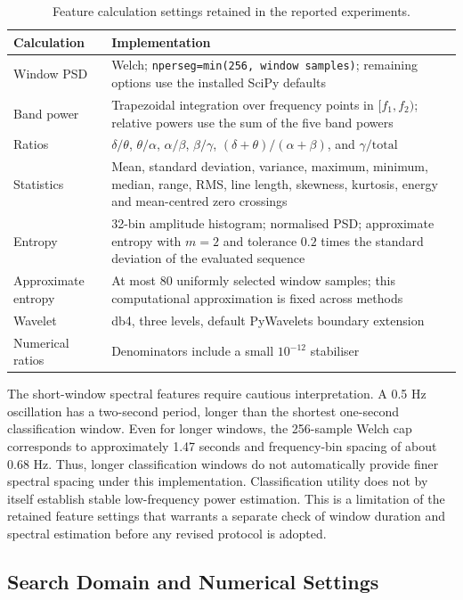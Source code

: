 \begin{table}[htbp]
\centering
\caption{Feature calculation settings retained in the reported experiments.}
\label{tab:feature-calculation-settings}
\renewcommand{\arraystretch}{1.15}
\begin{tabular}{lp{}}
\hline
Calculation & Implementation \\
\hline
Window PSD & Welch; \texttt{nperseg=min(256, window samples)}; remaining options use the installed SciPy defaults \\
Band power & Trapezoidal integration over frequency points in $[f_1,f_2)$; relative powers use the sum of the five band powers \\
Ratios & $\delta/\theta$, $\theta/\alpha$, $\alpha/\beta$, $\beta/\gamma$, $(\delta+\theta)/(\alpha+\beta)$, and $\gamma/\mathrm{total}$ \\
Statistics & Mean, standard deviation, variance, maximum, minimum, median, range, RMS, line length, skewness, kurtosis, energy and mean-centred zero crossings \\
Entropy & 32-bin amplitude histogram; normalised PSD; approximate entropy with $m=2$ and tolerance $0.2$ times the standard deviation of the evaluated sequence \\
Approximate entropy & At most 80 uniformly selected window samples; this computational approximation is fixed across methods \\
Wavelet & db4, three levels, default PyWavelets boundary extension \\
Numerical ratios & Denominators include a small $10^{-12}$ stabiliser \\
\hline
\end{tabular}
\end{table}

The short-window spectral features require cautious interpretation. A 0.5 Hz
oscillation has a two-second period, longer than the shortest one-second
classification window. Even for longer windows, the 256-sample Welch cap
corresponds to approximately 1.47 seconds and frequency-bin spacing of about
0.68 Hz. Thus, longer classification windows do not automatically provide
finer spectral spacing under this implementation. Classification utility does
not by itself establish stable low-frequency power estimation. This is a
limitation of the retained feature settings that warrants a separate check
of window duration and spectral estimation before any revised protocol is adopted.

\subsection{Search Domain and Numerical Settings}
\label{subsec:search-domain}

